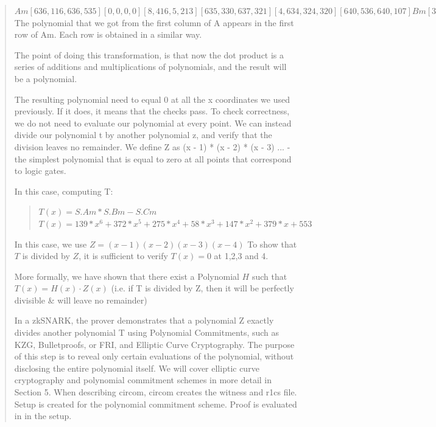    \begin{quote}
      $
      Am
      [636,116,636,535]
      [  0,  0,  0,  0]
      [  8,416,  5,213]
      [635,330,637,321]
      [  4,634,324,320]
      [640,536,640,107]

      Bm
      [  3,529,323,427]
      [  0,  0,  0,  0]
      [639,112,318,214]
      [  0,  0,  0,  0]
      [  0,  0,  0,  0]
      [  0,  0,  0,  0]

      Cm
      [  0,  0,  0,  0]
      [640,536,640,107]
      [  0,  0,  0,  0]
      [  4,423,322,534]
      [635,330,637,321]
      [  4,634,324,320]
      $
   The polynomial that we got from the first column of A appears in the first row of Am. Each row is obtained in a similar way.

The point of doing this transformation, is that now the dot product is a series of additions and multiplications of polynomials, and the result will be a polynomial.

The resulting polynomial need to equal 0 at all the x coordinates we used previously.
If it does, it means that the checks pass.
To check correctness, we do not need to evaluate our polynomial at every point. 
We can instead divide our polynomial t by another polynomial z, and verify that the division leaves no remainder.
We define Z as (x - 1) * (x - 2) * (x - 3) ... - the simplest polynomial that is equal to zero at all points that correspond to logic gates. 

In this case, computing T:
\begin{quote}
   $T(x) = S . Am * S . Bm - S . Cm  $
   $T(x) = 139*x^6 + 372*x^5 + 275*x^4 + 58*x^3 + 147*x^2 + 379*x + 553$
\end{quote}

In this case, we use $Z = (x-1)(x-2)(x-3)(x-4)$
To show that $T$ is divided by $Z$, it is sufficient to verify $T(x) = 0$ at 1,2,3 and 4.

More formally, we have shown that there exist a Polynomial $H$ such that $T(x)=H(x)⋅Z(x)$
(i.e. if T is divided by Z, then it will be perfectly divisible & will leave no remainder)

In a zkSNARK, the prover demonstrates that a polynomial Z exactly divides another polynomial
T using Polynomial Commitments, such as KZG, Bulletproofs, or FRI, and Elliptic Curve Cryptography. 
The purpose of this step is to reveal only certain evaluations of the polynomial, without disclosing the entire polynomial itself. 
We will cover elliptic curve cryptography and polynomial commitment schemes in more detail in Section 5.
   \iffalse
   When describing circom, circom creates the witness and r1cs file.
   Setup is created for the polynomial commitment scheme. Proof is evaluated in in the setup.


\end{quote}
